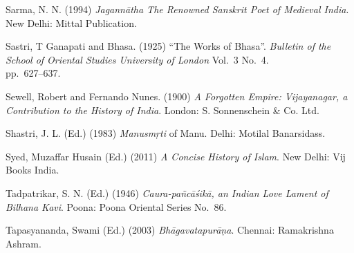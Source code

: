 \begin{thebibliography}{99}
Sarma, N. N. (1994) {\sl Jagannātha The Renowned Sanskrit Poet of Medieval India}. New Delhi: Mittal Publication.

Sastri, T Ganapati and Bhasa. (1925) “The Works of Bhasa”. {\sl Bulletin of the School of Oriental Studies University of London} Vol.~3 No.~4.\\ pp.~627--637.

Sewell, Robert and Fernando Nunes. (1900) {\sl A Forgotten Empire: Vijayanagar, a Contribution to the History of India}. London: S. Sonnenschein \& Co. Ltd.

Shastri, J. L. (Ed.) (1983) {\sl Manusmṛti} of Manu. Delhi: Motilal Banarsidass.

Syed, Muzaffar Husain (Ed.) (2011) {\sl A Concise History of Islam}. New Delhi: Vij Books India. 

Tadpatrikar, S. N. (Ed.) (1946) {\sl Caura-pañcāśikā, an Indian Love Lament of Bilhana Kavi}. Poona: Poona Oriental Series No.~86.

Tapasyananda, Swami (Ed.) (2003) {\sl Bhāgavatapurāṇa}. Chennai: Ramakrishna Ashram.

\end{thebibliography}

\theendnotes
